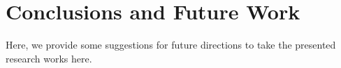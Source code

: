 \chapter{Conclusions and Future Work}

Here, we provide some suggestions for future directions to take the presented research works here.
